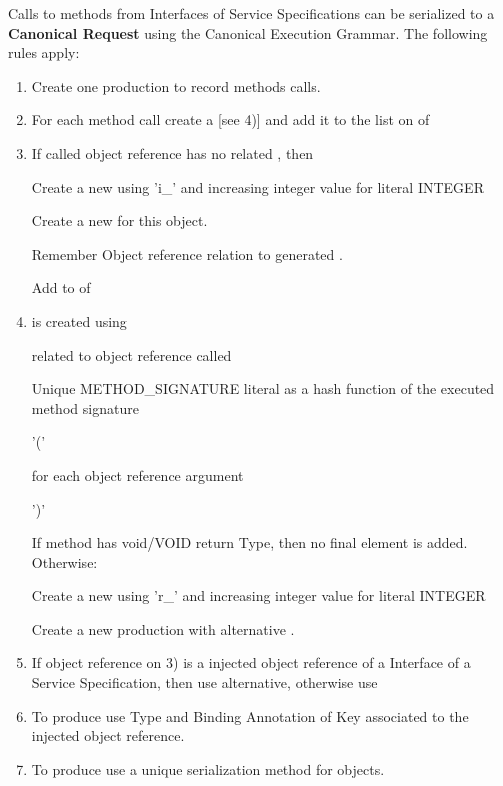 Calls to methods from Interfaces of Service Specifications can be serialized to a \textbf{Canonical Request} using the Canonical Execution Grammar. The following rules apply:
\begin{enumerate}
 \item Create one  production to record methods calls.
 \item For each method call create a  [see 4)] and add it to the list on  of 
 \item If called object reference has no related , then 

Create a new  using 'i_' and increasing integer value for literal INTEGER 

Create a new  for this object. 

Remember Object reference relation to generated . 

Add  to  of 

 \item {} is created using

  related to object reference called

 Unique METHOD_SIGNATURE literal as a hash function of the executed method signature

 '('

 for each object reference argument 

')' 

 If method has  void/VOID return Type, then no final  element is added. Otherwise:

Create a new  using 'r_' and increasing integer value for literal INTEGER 

Create a new  production with alternative .
 
\item If object reference on 3) is a injected object reference of a Interface of a Service Specification, then use  alternative, otherwise use 
 \item To produce  use Type and Binding Annotation of Key associated to the injected object reference.
 \item To produce  use a unique serialization method for objects.
\end{enumerate}


